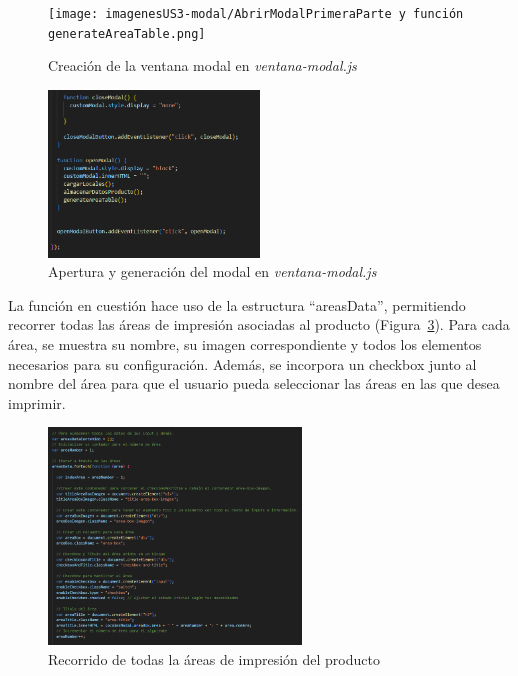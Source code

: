 \documentclass[11pt]{article}
\begin{document}
\begin{figure}[H]
    \centering
    \texttt{[image: imagenesUS3-modal/AbrirModalPrimeraParte y función generateAreaTable.png]}
    \caption{\label{fig:iniciojs} Creación de la ventana modal en \textit{ventana-modal.js}}
    \vspace{\fill}
\end{figure}

\begin{figure}[H]
    \centering
    \includegraphics[width=0.5\textwidth]{imagenesUS3-modal/FinalDeOpenModal.png}
    \caption{\label{fig:finaljs} Apertura y generación del modal en \textit{ventana-modal.js}}
    \vspace{\fill}
\end{figure}

La función en cuestión hace uso de la estructura ``areasData'', permitiendo recorrer todas las áreas de impresión asociadas al producto (Figura~\ref{fig:recorrerAreas}). 
Para cada área, se muestra su nombre, su imagen correspondiente y todos los elementos necesarios para su configuración. Además, se incorpora
un checkbox junto al nombre del área para que el usuario pueda seleccionar las áreas en las que desea imprimir.

\begin{figure}[H]
    \centering
    \includegraphics[width=0.6\textwidth]{imagenesUS3-modal/recorrerAreasyMostrar.png}
    \caption{\label{fig:recorrerAreas} Recorrido de todas la áreas de impresión del producto}
    \vspace{\fill}
\end{figure}
\end{document}
